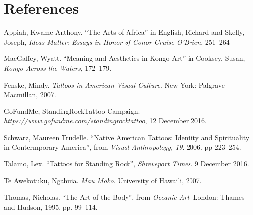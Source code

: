 \section*{References}

\bibent Appiah, Kwame Anthony. ``The Arts of Africa'' in English, Richard and
Skelly, Joseph, \textit{Ideas Matter: Essays in Honor of Conor Cruise O'Brien},
251--264

\bibent MacGaffey, Wyatt. ``Meaning and Aesthetics in Kongo Art'' in Cooksey,
Susan, \textit{Kongo Across the Waters}, 172--179.

\bibent Fenske, Mindy. \textit{Tattoos in American Visual Culture}. New York:
Palgrave Macmillan, 2007.

\bibent GoFundMe, StandingRockTattoo Campaign.
\textit{https://www.gofundme.com/standingrocktattoo}, 12 December 2016.

\bibent Schwarz, Maureen Trudelle. ``Native American Tattoos: Identity and
Spirituality in Contermporary America'', from \textit{Visual Anthropology, 19}.
2006. pp 223--254.

\bibent Talamo, Lex. ``Tattoos for Standing Rock'', \textit{Shreveport Times}. 9
December 2016.

\bibent Te Awekotuku, Ngahuia. \textit{Mau Moko}. University of Hawai'i, 2007.

\bibent Thomas, Nicholas. ``The Art of the Body'', from \textit{Oceanic Art}.
London: Thames and Hudson, 1995. pp.  99--114.
